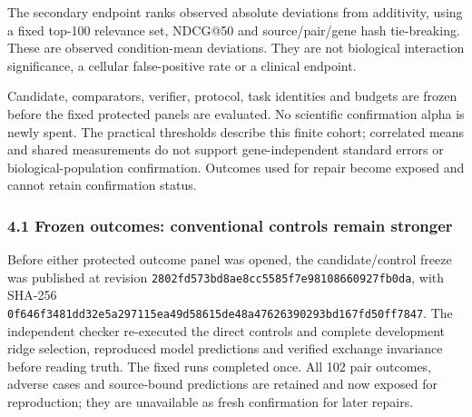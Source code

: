 \documentclass[
  10pt,
]{article}
\begin{document}
The secondary endpoint ranks observed absolute deviations from
additivity, using a fixed top-100 relevance set, NDCG@50 and
source/pair/gene hash tie-breaking. These are observed condition-mean
deviations. They are not biological interaction significance, a cellular
false-positive rate or a clinical endpoint.

Candidate, comparators, verifier, protocol, task identities and budgets
are frozen before the fixed protected panels are evaluated. No
scientific confirmation alpha is newly spent. The practical thresholds
describe this finite cohort; correlated means and shared measurements do
not support gene-independent standard errors or biological-population
confirmation. Outcomes used for repair become exposed and cannot retain
confirmation status.

\hypertarget{frozen-outcomes-conventional-controls-remain-stronger}{%
\subsubsection{4.1 Frozen outcomes: conventional controls remain
stronger}\label{frozen-outcomes-conventional-controls-remain-stronger}}

Before either protected outcome panel was opened, the candidate/control
freeze was published at revision
\nolinkurl{2802fd573bd8ae8cc5585f7e98108660927fb0da}, with SHA-256
\nolinkurl{0f646f3481dd32e5a297115ea49d58615de48a47626390293bd167fd50ff7847}.
The independent checker re-executed the direct controls and complete
development ridge selection, reproduced model predictions and verified
exchange invariance before reading truth. The fixed runs completed once.
All 102 pair outcomes, adverse cases and source-bound predictions are
retained and now exposed for reproduction; they are unavailable as fresh
confirmation for later repairs.
\end{document}

